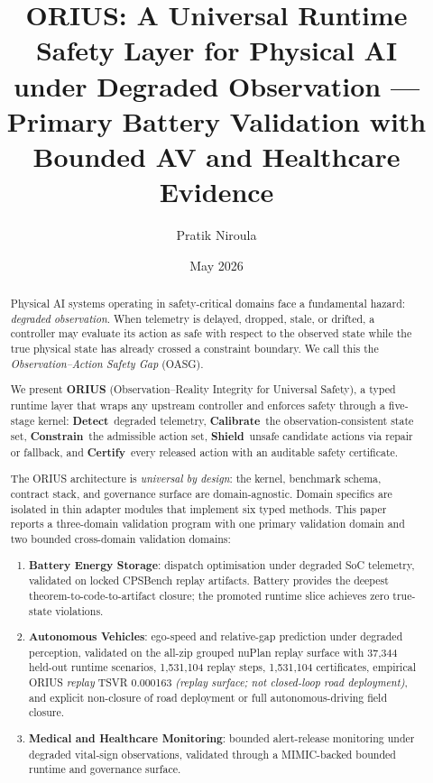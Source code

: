 \documentclass[10pt,journal,twocolumn]{IEEEtran}
\title{ORIUS: A Universal Runtime Safety Layer for Physical AI\\under Degraded Observation ---\\Primary Battery Validation with Bounded AV and Healthcare Evidence}
\author{Pratik Niroula}
\date{May 2026}
\begin{document}
\maketitle

\begin{abstract}
Physical AI systems operating in safety-critical domains face a fundamental hazard:
\emph{degraded observation}.  When telemetry is delayed, dropped, stale, or drifted,
a controller may evaluate its action as safe with respect to the observed state while
the true physical state has already crossed a constraint boundary.  We call this the
\emph{Observation--Action Safety Gap} (OASG).

We present \textbf{ORIUS} (Observation--Reality Integrity for Universal Safety), a
typed runtime layer that wraps any upstream controller and enforces safety through a
five-stage kernel: \textbf{Detect}~degraded telemetry, \textbf{Calibrate}~the
observation-consistent state set, \textbf{Constrain}~the admissible action set,
\textbf{Shield}~unsafe candidate actions via repair or fallback, and
\textbf{Certify}~every released action with an auditable safety certificate.

The ORIUS architecture is \emph{universal by design}: the kernel, benchmark schema,
contract stack, and governance surface are domain-agnostic.  Domain specifics are
isolated in thin adapter modules that implement six typed methods.  This paper
reports a three-domain validation program with one primary validation domain and two
bounded cross-domain validation domains:

\begin{enumerate}[nosep]
  \item \textbf{Battery Energy Storage}: dispatch optimisation under degraded SoC
        telemetry, validated on locked CPSBench replay artifacts.  Battery provides
        the deepest theorem-to-code-to-artifact closure; the
        promoted runtime slice achieves zero true-state violations.
  \item \textbf{Autonomous Vehicles}: ego-speed and relative-gap prediction under
        degraded perception, validated on the all-zip grouped nuPlan replay surface
        with 37{,}344 held-out runtime scenarios, 1{,}531{,}104 replay steps,
        1{,}531{,}104 certificates, empirical ORIUS \emph{replay} TSVR 0.000163
        \emph{(replay surface; not closed-loop road deployment)}, and explicit
        non-closure of road deployment or full autonomous-driving field closure.
  \item \textbf{Medical and Healthcare Monitoring}: bounded alert-release monitoring
        under degraded vital-sign observations, validated through a MIMIC-backed
        bounded runtime and governance surface.
\end{enumerate}


\end{abstract}
\end{document}
